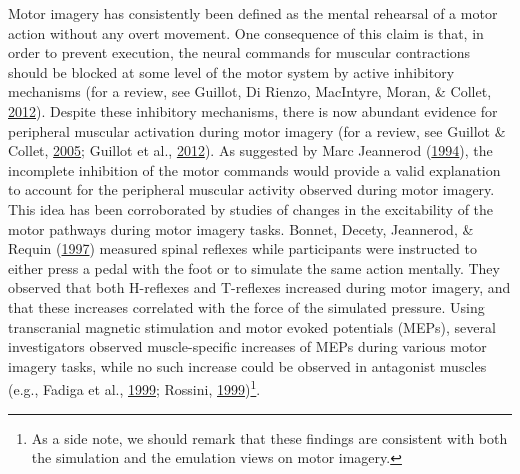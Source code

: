 \documentclass[a4paper,12pt,twoside,openright,oldfontcommands]{memoir}
\let\rmarkdownfootnote\footnote%
\def\footnote{\protect\rmarkdownfootnote}
\begin{document}
Motor imagery has consistently been defined as the mental rehearsal of a
motor action without any overt movement. One consequence of this claim
is that, in order to prevent execution, the neural commands for muscular
contractions should be blocked at some level of the motor system by
active inhibitory mechanisms (for a review, see Guillot, Di Rienzo,
MacIntyre, Moran, \& Collet,
\protect\hyperlink{ref-guillot_imagining_2012}{2012}). Despite these
inhibitory mechanisms, there is now abundant evidence for peripheral
muscular activation during motor imagery (for a review, see Guillot \&
Collet, \protect\hyperlink{ref-guillot_contribution_2005}{2005}; Guillot
et al., \protect\hyperlink{ref-guillot_imagining_2012}{2012}). As
suggested by Marc Jeannerod
(\protect\hyperlink{ref-jeannerod_representing_1994}{1994}), the
incomplete inhibition of the motor commands would provide a valid
explanation to account for the peripheral muscular activity observed
during motor imagery. This idea has been corroborated by studies of
changes in the excitability of the motor pathways during motor imagery
tasks. Bonnet, Decety, Jeannerod, \& Requin
(\protect\hyperlink{ref-bonnet_mental_1997}{1997}) measured spinal
reflexes while participants were instructed to either press a pedal with
the foot or to simulate the same action mentally. They observed that
both H-reflexes and T-reflexes increased during motor imagery, and that
these increases correlated with the force of the simulated pressure.
Using transcranial magnetic stimulation and motor evoked potentials
(MEPs), several investigators observed muscle-specific increases of MEPs
during various motor imagery tasks, while no such increase could be
observed in antagonist muscles (e.g., Fadiga et al.,
\protect\hyperlink{ref-fadiga_corticospinal_1999}{1999}; Rossini,
\protect\hyperlink{ref-rossini_corticospinal_1999}{1999})\footnote{As a
  side note, we should remark that these findings are consistent with
  both the simulation and the emulation views on motor imagery.}.
\end{document}
